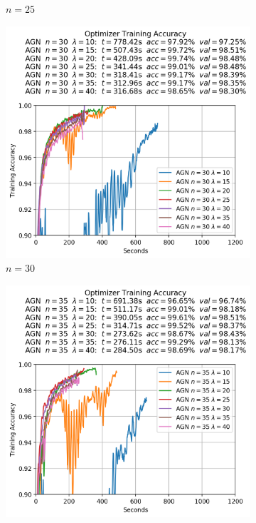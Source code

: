 \begin{figure}
\begin{subfigure}{.3\textwidth}
    \caption{$n = 25$}
  \end{subfigure}
  \begin{subfigure}{.3\textwidth}
    \centering
    \includegraphics[width=\linewidth]{resources/images/agn_experiments_workers_30}
    \caption{$n = 30$}
  \end{subfigure}
  \begin{subfigure}{.3\textwidth}
    \centering
    \includegraphics[width=\linewidth]{resources/images/agn_experiments_workers_35}

\end{subfigure}
\end{figure}
